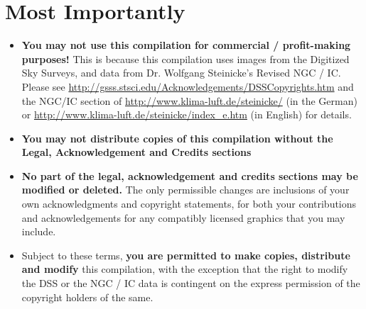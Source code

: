 \section*{Most Importantly}
\begin{itemize}
\item \textbf{You may not use this compilation for commercial /
  profit-making purposes!}  This is because this compilation uses
  images from the Digitized Sky Surveys, and data from Dr. Wolfgang
  Steinicke's Revised NGC / IC. Please see
  \url{http://gsss.stsci.edu/Acknowledgements/DSSCopyrights.htm} and
  the NGC/IC section of \url{http://www.klima-luft.de/steinicke/} (in
  the German) or \url{http://www.klima-luft.de/steinicke/index_e.htm}
  (in English) for details.
\item \textbf{You may not distribute copies of this compilation
  without the Legal, Acknowledgement and Credits sections}
\item \textbf{No part of the legal, acknowledgement and credits
  sections may be modified or deleted.} The only permissible changes
  are inclusions of your own acknowledgments and copyright statements,
  for both your contributions and acknowledgements for any compatibly
  licensed graphics that you may include.
\item Subject to these terms, \textbf{you are permitted to make
  copies, distribute and modify} this compilation, with the exception
  that the right to modify the DSS or the NGC / IC data is contingent
  on the express permission of the copyright holders of the same.
\end{itemize}

